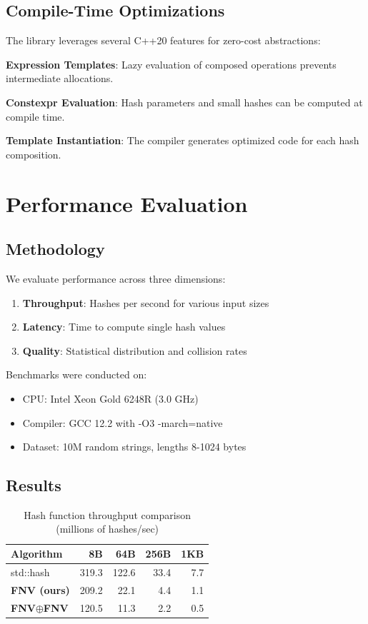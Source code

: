 \documentclass[11pt,a4paper]{article}
\theoremstyle{definition}
\begin{document}
\subsection{Compile-Time Optimizations}

The library leverages several C++20 features for zero-cost abstractions:

\textbf{Expression Templates}: Lazy evaluation of composed operations prevents intermediate allocations.

\textbf{Constexpr Evaluation}: Hash parameters and small hashes can be computed at compile time.

\textbf{Template Instantiation}: The compiler generates optimized code for each hash composition.

\section{Performance Evaluation}

\subsection{Methodology}

We evaluate performance across three dimensions:

\begin{enumerate}
    \item \textbf{Throughput}: Hashes per second for various input sizes
    \item \textbf{Latency}: Time to compute single hash values
    \item \textbf{Quality}: Statistical distribution and collision rates
\end{enumerate}

Benchmarks were conducted on:
\begin{itemize}
    \item CPU: Intel Xeon Gold 6248R (3.0 GHz)
    \item Compiler: GCC 12.2 with -O3 -march=native
    \item Dataset: 10M random strings, lengths 8-1024 bytes
\end{itemize}

\subsection{Results}

\begin{table}[h]
\centering
\caption{Hash function throughput comparison (millions of hashes/sec)}
\begin{tabular}{lrrrr}
\toprule
\textbf{Algorithm} & \textbf{8B} & \textbf{64B} & \textbf{256B} & \textbf{1KB} \\
\midrule
std::hash & 319.3 & 122.6 & 33.4 & 7.7 \\
\textbf{FNV (ours)} & 209.2 & 22.1 & 4.4 & 1.1 \\
\textbf{FNV$\oplus$FNV} & 120.5 & 11.3 & 2.2 & 0.5 \\
\bottomrule
\end{tabular}
\end{table}
\end{document}
